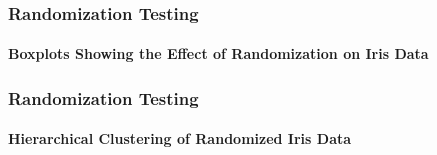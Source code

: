 \documentclass[10pt]{beamer}
\begin{document}
\begin{frame}
\frametitle{Randomization Testing}
\framesubtitle{Boxplots Showing the Effect of Randomization on Iris Data}
\begin{center}
\end{center}
\end{frame}


\begin{frame}
\frametitle{Randomization Testing}
\framesubtitle{Hierarchical Clustering of Randomized Iris Data}
\begin{center}

\end{center}
\end{frame}
\end{document}
